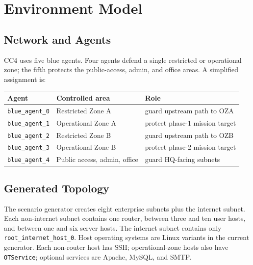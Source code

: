 \section{Environment Model}

\subsection{Network and Agents}

CC4 uses five blue agents. Four agents defend a single restricted or operational zone; the fifth protects the public-access, admin, and office areas. A simplified assignment is:

\begin{center}
\begin{tabular}{lll}
\toprule
\textbf{Agent} & \textbf{Controlled area} & \textbf{Role} \\
\midrule
\texttt{blue\_agent\_0} & Restricted Zone A & guard upstream path to OZA \\
\texttt{blue\_agent\_1} & Operational Zone A & protect phase-1 mission target \\
\texttt{blue\_agent\_2} & Restricted Zone B & guard upstream path to OZB \\
\texttt{blue\_agent\_3} & Operational Zone B & protect phase-2 mission target \\
\texttt{blue\_agent\_4} & Public access, admin, office & guard HQ-facing subnets \\
\bottomrule
\end{tabular}
\end{center}

\subsection{Generated Topology}

The scenario generator creates eight enterprise subnets plus the internet
subnet. Each non-internet subnet contains one router, between three and ten
user hosts, and between one and six server hosts. The internet subnet contains
only \texttt{root\_internet\_host\_0}. Host operating systems are Linux variants
in the current generator. Each non-router host has SSH; operational-zone hosts
also have \texttt{OTService}; optional services are Apache, MySQL, and SMTP.

